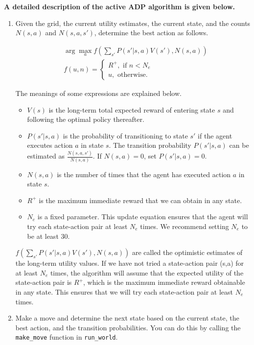 \documentclass[12pt]{article}
\begin{document}
{\bf A detailed description of the active ADP algorithm is given below.}
\begin{enumerate}

\item Given the grid, the current utility estimates, the current state, and the counts $N(s,a)$ and $N(s,a,s')$, determine the best action as follows.
    
\begin{align}
& \arg\max_a f \left( \sum_{s'} P(s'|s,a) V(s'), N(s,a) \right) \\
& f(u,n) = 
\begin{cases}
R^+, \text{ if } n < N_e \\
u, \text{ otherwise.}
\end{cases}
\end{align}

The meanings of some expressions are explained below.
\begin{itemize}
\item $V(s)$ is the long-term total expected reward of entering state $s$ and following the optimal policy thereafter.
\item $P(s'|s,a)$ is the probability of transitioning to state $s'$ if the agent executes action $a$ in state $s$. The transition probability $P(s'|s, a)$ can be estimated as $\displaystyle \frac{N(s,a,s')}{N(s,a)}$. If $N(s,a) = 0$, set $P(s'|s,a) = 0$.
\item $N(s,a)$ is the number of times that the agent has executed action $a$ in state $s$.
\item $R^+$ is the maximum immediate reward that we can obtain in any state.
\item $N_e$ is a fixed parameter. This update equation ensures that the agent will try each state-action pair at least $N_e$ times. We recommend setting $N_e$ to be at least $30$.
\end{itemize}

$f \left( \sum_{s'} P(s'|s,a) V(s'), N(s,a) \right)$ are called the optimistic estimates of the long-term utility values. If we have not tried a state-action pair (s,a) for at least $N_e$ times, the algorithm will assume that the expected utility of the state-action pair is $R^+$, which is the maximum immediate reward obtainable in any state. This ensures that we will try each state-action pair at least $N_e$ times.

\item 
Make a move and determine the next state based on the current state, the best action, and the transition probabilities. You can do this by calling the \verb+make_move+ function in \verb+run_world+.


\end{enumerate}
\end{document}
